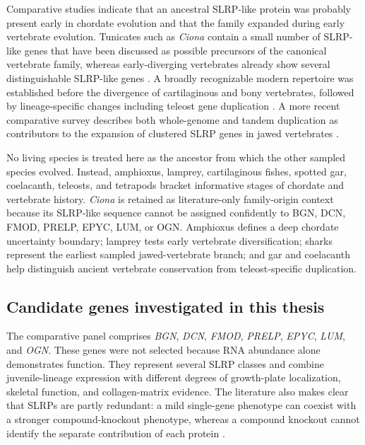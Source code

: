 Comparative studies indicate that an ancestral SLRP-like protein was probably
present early in chordate evolution and that the family expanded during early
vertebrate evolution. Tunicates such as \textit{Ciona} contain a small number
of SLRP-like genes that have been discussed as possible precursors of the
canonical vertebrate family, whereas early-diverging vertebrates already show
several distinguishable SLRP-like genes \citep{Park2008}. A broadly recognizable
modern repertoire was established before the divergence of cartilaginous and
bony vertebrates, followed by lineage-specific changes including teleost gene
duplication \citep{Costa2018}. A more recent comparative survey describes
both whole-genome and tandem duplication as contributors to the expansion of
clustered SLRP genes in jawed vertebrates \citep{Gil2025}.

No living species is treated here as the ancestor from which the other sampled
species evolved. Instead, amphioxus, lamprey, cartilaginous fishes, spotted gar,
coelacanth, teleosts, and tetrapods bracket informative stages of chordate and
vertebrate history. \textit{Ciona} is retained as literature-only family-origin
context because its SLRP-like sequence cannot be assigned confidently to BGN,
DCN, FMOD, PRELP, EPYC, LUM, or OGN. Amphioxus defines a deep chordate
uncertainty boundary; lamprey tests early vertebrate diversification; sharks
represent the earliest sampled jawed-vertebrate branch; and gar and coelacanth
help distinguish ancient vertebrate conservation from teleost-specific
duplication.

\subsection{Candidate genes investigated in this thesis}
\label{subsec:candidate-genes}

The comparative panel comprises \textit{BGN}, \textit{DCN}, \textit{FMOD},
\textit{PRELP}, \textit{EPYC}, \textit{LUM}, and \textit{OGN}. These genes were not selected
because RNA abundance alone demonstrates function. They represent several SLRP
classes and combine juvenile-lineage expression with different degrees of
growth-plate localization, skeletal function, and collagen-matrix evidence.
The literature also makes clear that SLRPs are partly redundant: a mild
single-gene phenotype can coexist with a stronger compound-knockout phenotype,
whereas a compound knockout cannot identify the separate contribution of each
protein \citep{Nikitovic2012}.

